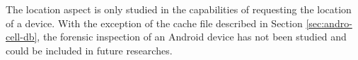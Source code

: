 The location aspect is only studied in the capabilities of requesting the location of a device.
With the exception of the cache file described in Section \ref{sec:andro-cell-db}, the forensic inspection of an Android device has not been studied and could be included in future researches.




